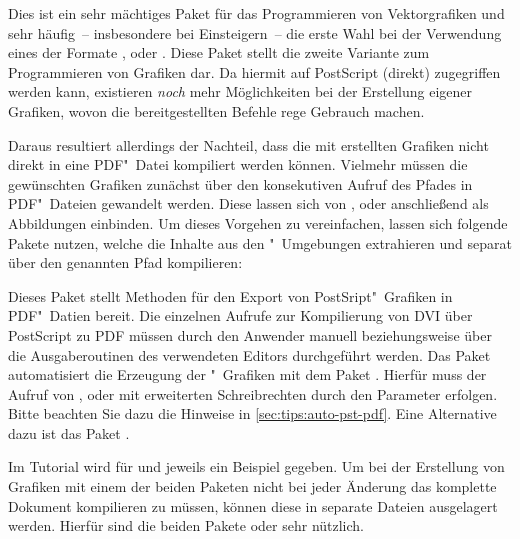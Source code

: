 \begin{DeclarePackages}
  Dies ist ein sehr mächtiges Paket für das Programmieren von Vektorgrafiken 
  und sehr häufig~-- insbesondere bei Einsteigern~-- die erste Wahl bei der 
  Verwendung eines der Formate ,  oder 
  .
  Diese Paket stellt die zweite Variante zum Programmieren von Grafiken dar. 
  Da hiermit auf PostScript (direkt) zugegriffen werden kann, existieren 
  \emph{noch} mehr Möglichkeiten bei der Erstellung eigener Grafiken, wovon
  die bereitgestellten Befehle rege Gebrauch machen.
  
  Daraus resultiert allerdings der Nachteil, dass die mit  
  erstellten Grafiken nicht direkt in eine PDF"~Datei kompiliert werden können. 
  Vielmehr müssen die gewünschten Grafiken zunächst über den konsekutiven 
  Aufruf des Pfades  in PDF"~Dateien gewandelt 
  werden. Diese lassen sich von ,  oder 
   anschließend als Abbildungen einbinden. Um dieses Vorgehen 
  zu vereinfachen, lassen sich folgende Pakete nutzen, welche die Inhalte aus 
  den "~Umgebungen extrahieren und separat über den 
  genannten Pfad kompilieren:
  \begin{DeclarePackages}
    Dieses Paket stellt Methoden für den Export von PostSript"~Grafiken in 
    PDF"~Datien bereit. Die einzelnen Aufrufe zur Kompilierung von DVI über 
    PostScript zu PDF müssen durch den Anwender manuell beziehungsweise über 
    die Ausgaberoutinen des verwendeten Editors durchgeführt werden.
    Das Paket automatisiert die Erzeugung der "~Grafiken mit 
    dem Paket . Hierfür muss der Aufruf von , 
     oder  mit erweiterten Schreibrechten 
    durch den Parameter  erfolgen. Bitte beachten Sie 
    dazu die Hinweise in \autoref{sec:tips:auto-pst-pdf}. Eine Alternative dazu 
    ist das Paket .
  \end{DeclarePackages}
\end{DeclarePackages}
%
Im Tutorial  wird für  und  
jeweils ein Beispiel gegeben. Um bei der Erstellung von Grafiken mit einem der 
beiden Paketen nicht bei jeder Änderung das komplette Dokument kompilieren zu 
müssen, können diese in separate Dateien ausgelagert werden. Hierfür sind die 
beiden Pakete  oder  sehr nützlich.

